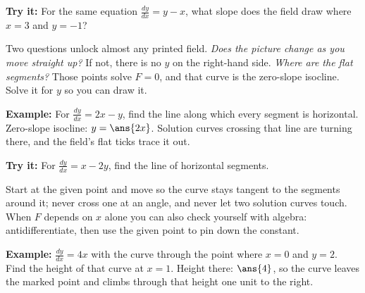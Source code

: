\documentclass[12pt]{article}
\begin{document}
\begin{tryitbox}
\textbf{Try it:} For the same equation $\frac{dy}{dx} = y - x$, what slope does
the field draw where $x = 3$ and $y = -1$?\\[2pt]
\end{tryitbox}


\begin{formulabox}
Two questions unlock almost any printed field. \emph{Does the picture change as
you move straight up?} If not, there is no $y$ on the right-hand side.
\emph{Where are the flat segments?} Those points solve $F = 0$, and that curve
is the zero-slope isocline. Solve it for $y$ so you can draw it.
\end{formulabox}

\begin{examplebox}
\textbf{Example:} For $\frac{dy}{dx} = 2x - y$, find the line along which every
segment is horizontal.
Zero-slope isocline: $y = \ans{2x}$. Solution curves crossing that line are
turning there, and the field's flat ticks trace it out.
\end{examplebox}

\begin{tryitbox}
\textbf{Try it:} For $\frac{dy}{dx} = x - 2y$, find the line of horizontal
segments.\\[2pt]
\end{tryitbox}


\begin{formulabox}
Start at the given point and move so the curve stays tangent to the segments
around it; never cross one at an angle, and never let two solution curves
touch. When $F$ depends on $x$ alone you can also check yourself with algebra:
antidifferentiate, then use the given point to pin down the constant.
\end{formulabox}

\begin{examplebox}
\textbf{Example:} $\frac{dy}{dx} = 4x$ with the curve through the point where
$x = 0$ and $y = 2$. Find the height of that curve at $x = 1$.
Height there: $\ans{4}$, so the curve leaves the marked point and climbs
through that height one unit to the right.
\end{examplebox}
\end{document}
